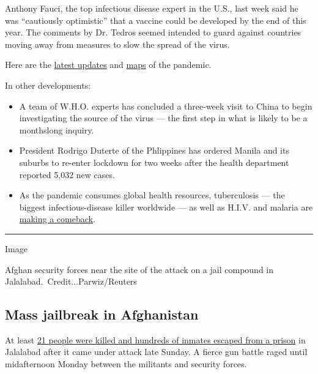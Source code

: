 Anthony Fauci, the top infectious disease expert in the U.S., last week
said he was ``cautiously optimistic'' that a vaccine could be developed
by the end of this year. The comments by Dr. Tedros seemed intended to
guard against countries moving away from measures to slow the spread of
the virus.

Here are the
\href{https://www.nytimes.com/2020/08/03/world/coronavirus-covid-19.html?action=click\&pgtype=Article\&state=default\&module=styln-coronavirus\&region=TOP_BANNER\&context=storylines_menu}{latest
updates} and
\href{https://www.nytimes.com/interactive/2020/world/coronavirus-maps.html}{maps}
of the pandemic.

In other developments:

\begin{itemize}
\item
  A team of W.H.O. experts has concluded a three-week visit to China to
  begin investigating the source of the virus --- the first step in what
  is likely to be a monthslong inquiry.
\item
  President Rodrigo Duterte of the Phlippines has ordered Manila and its
  suburbs to re-enter lockdown for two weeks after the health department
  reported 5,032 new cases.
\item
  As the pandemic consumes global health resources, tuberculosis --- the
  biggest infectious-disease killer worldwide --- as well as H.I.V. and
  malaria are
  \href{https://www.nytimes.com/2020/08/03/health/coronavirus-tuberculosis-aids-malaria.html}{making
  a comeback}.
\end{itemize}

\begin{center}\rule{0.5\linewidth}{\linethickness}\end{center}

Image

Afghan security forces near the site of the attack on a jail compound in
Jalalabad.~Credit...Parwiz/Reuters

\hypertarget{mass-jailbreak-in-afghanistan}{%
\subsection{Mass jailbreak in
Afghanistan}\label{mass-jailbreak-in-afghanistan}}

At least
\href{https://www.nytimes.com/2020/08/03/world/asia/afghanistan-prison-isis-taliban.html}{21
people were killed and hundreds of inmates escaped from a prison} in
Jalalabad after it came under attack late Sunday. A fierce gun battle
raged until midafternoon Monday between the militants and security
forces.

